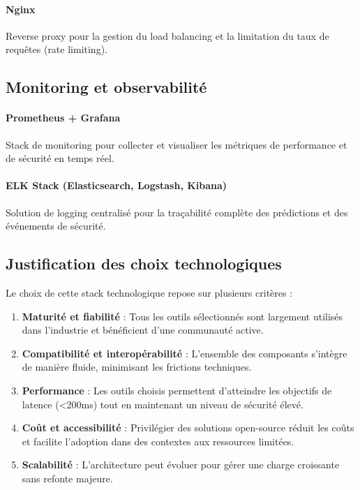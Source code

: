 \paragraph{Nginx}
Reverse proxy pour la gestion du load balancing et la limitation du taux de requêtes (rate limiting).

\subsection{Monitoring et observabilité}

\paragraph{Prometheus + Grafana}
Stack de monitoring pour collecter et visualiser les métriques de performance et de sécurité en temps réel.

\paragraph{ELK Stack (Elasticsearch, Logstash, Kibana)}
Solution de logging centralisé pour la traçabilité complète des prédictions et des événements de sécurité.

\subsection{Justification des choix technologiques}

Le choix de cette stack technologique repose sur plusieurs critères :

\begin{enumerate}
    \item \textbf{Maturité et fiabilité} : Tous les outils sélectionnés sont largement utilisés dans l'industrie et bénéficient d'une communauté active.

    \item \textbf{Compatibilité et interopérabilité} : L'ensemble des composants s'intègre de manière fluide, minimisant les frictions techniques.

    \item \textbf{Performance} : Les outils choisis permettent d'atteindre les objectifs de latence (<200ms) tout en maintenant un niveau de sécurité élevé.

    \item \textbf{Coût et accessibilité} : Privilégier des solutions open-source réduit les coûts et facilite l'adoption dans des contextes aux ressources limitées.

    \item \textbf{Scalabilité} : L'architecture peut évoluer pour gérer une charge croissante sans refonte majeure.
\end{enumerate}

